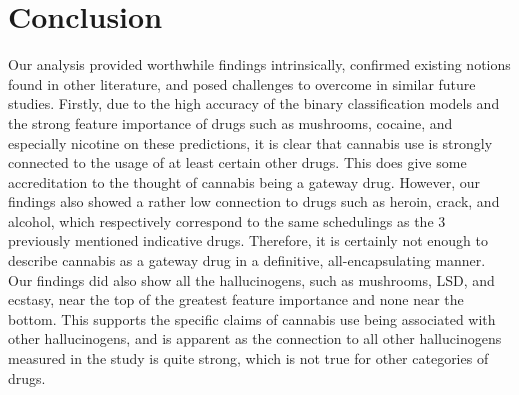 \documentclass{article}
\begin{document}
\section{Conclusion}
\vspace*{-2mm}
Our analysis provided worthwhile findings intrinsically, confirmed existing notions found in other literature, and posed challenges to overcome in similar future studies. Firstly, due to the high accuracy of the binary classification models and the strong feature importance of drugs such as mushrooms, cocaine, and especially nicotine on these predictions, it is clear that cannabis use is strongly connected to the usage of at least certain other drugs. This does give some accreditation to the thought of cannabis being a gateway drug. However, our findings also showed a rather low connection to drugs such as heroin, crack, and alcohol, which respectively correspond to the same schedulings as the 3 previously mentioned indicative drugs. Therefore, it is certainly not enough to describe cannabis as a gateway drug in a definitive, all-encapsulating manner. 
Our findings did also show all the hallucinogens, such as mushrooms, LSD, and ecstasy, near the top of the greatest feature importance and none near the bottom. This supports the specific claims of cannabis use being associated with other hallucinogens, and is apparent as the connection to all other hallucinogens measured in the study is quite strong, which is not true for other categories of drugs.
\end{document}
